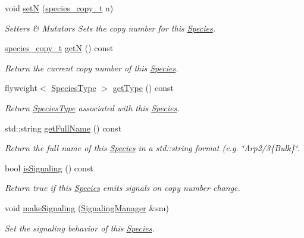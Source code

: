 \begin{DoxyCompactItemize}
void \hyperlink{group__Chemistry_ga88de7cf5130cb9cee2da3585374db654}{set\-N} (\hyperlink{common_8h_a3503f321fd36304ee274141275cca586}{species\-\_\-copy\-\_\-t} n)
\begin{DoxyCompactList}\small\item\em Setters \& Mutators Sets the copy number for this \hyperlink{classSpecies}{Species}. \end{DoxyCompactList}\item 
\hyperlink{common_8h_a3503f321fd36304ee274141275cca586}{species\-\_\-copy\-\_\-t} \hyperlink{group__Chemistry_gaea7327b3fed261c705b4d32b9973aa58}{get\-N} () const 
\begin{DoxyCompactList}\small\item\em Return the current copy number of this \hyperlink{classSpecies}{Species}. \end{DoxyCompactList}\item 
flyweight$<$ \hyperlink{classSpeciesType}{Species\-Type} $>$ \hyperlink{group__Chemistry_gab4d28cd0fed02b921070000b522cdd70}{get\-Type} () const 
\begin{DoxyCompactList}\small\item\em Return \hyperlink{classSpeciesType}{Species\-Type} associated with this \hyperlink{classSpecies}{Species}. \end{DoxyCompactList}\item 
std\-::string \hyperlink{group__Chemistry_ga121a9553f9e2018d7d51910b5d781316}{get\-Full\-Name} () const 
\begin{DoxyCompactList}\small\item\em Return the full name of this \hyperlink{classSpecies}{Species} in a std\-::string format (e.\-g. \char`\"{}\-Arp2/3\{\-Bulk\}\char`\"{}. \end{DoxyCompactList}\item 
bool \hyperlink{group__Chemistry_ga8b801502dea3f30daf4494279cbda1c8}{is\-Signaling} () const 
\begin{DoxyCompactList}\small\item\em Return true if this \hyperlink{classSpecies}{Species} emits signals on copy number change. \end{DoxyCompactList}\item 
void \hyperlink{group__Chemistry_ga188aa6fa6b7c84f4c740df869a46e263}{make\-Signaling} (\hyperlink{classSignalingManager}{Signaling\-Manager} \&sm)
\begin{DoxyCompactList}\small\item\em Set the signaling behavior of this \hyperlink{classSpecies}{Species}. \end{DoxyCompactList}\item 

\end{DoxyCompactItemize}
